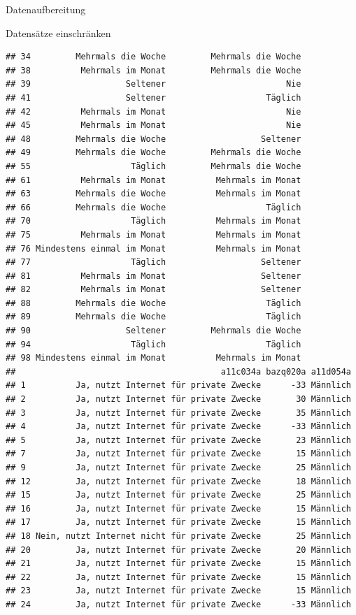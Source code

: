 \documentclass[ignorenonframetext,]{beamer}
\begin{document}
\begin{frame}[fragile]{Datenaufbereitung}
\begin{block}{Datensätze einschränken}
\begin{verbatim}
## 34         Mehrmals die Woche         Mehrmals die Woche
## 38          Mehrmals im Monat         Mehrmals die Woche
## 39                   Seltener                        Nie
## 41                   Seltener                    Täglich
## 42          Mehrmals im Monat                        Nie
## 45          Mehrmals im Monat                        Nie
## 48         Mehrmals die Woche                   Seltener
## 49         Mehrmals die Woche         Mehrmals die Woche
## 55                    Täglich         Mehrmals die Woche
## 61          Mehrmals im Monat          Mehrmals im Monat
## 63         Mehrmals die Woche          Mehrmals im Monat
## 66         Mehrmals die Woche                    Täglich
## 70                    Täglich          Mehrmals im Monat
## 75          Mehrmals im Monat          Mehrmals im Monat
## 76 Mindestens einmal im Monat          Mehrmals im Monat
## 77                    Täglich                   Seltener
## 81          Mehrmals im Monat                   Seltener
## 82          Mehrmals im Monat                   Seltener
## 88         Mehrmals die Woche                    Täglich
## 89         Mehrmals die Woche                    Täglich
## 90                   Seltener         Mehrmals die Woche
## 94                    Täglich                    Täglich
## 98 Mindestens einmal im Monat          Mehrmals im Monat
##                                         a11c034a bazq020a a11d054a
## 1          Ja, nutzt Internet für private Zwecke      -33 Männlich
## 2          Ja, nutzt Internet für private Zwecke       30 Männlich
## 3          Ja, nutzt Internet für private Zwecke       35 Männlich
## 4          Ja, nutzt Internet für private Zwecke      -33 Männlich
## 5          Ja, nutzt Internet für private Zwecke       23 Männlich
## 7          Ja, nutzt Internet für private Zwecke       15 Männlich
## 9          Ja, nutzt Internet für private Zwecke       25 Männlich
## 12         Ja, nutzt Internet für private Zwecke       18 Männlich
## 15         Ja, nutzt Internet für private Zwecke       25 Männlich
## 16         Ja, nutzt Internet für private Zwecke       15 Männlich
## 17         Ja, nutzt Internet für private Zwecke       15 Männlich
## 18 Nein, nutzt Internet nicht für private Zwecke       25 Männlich
## 20         Ja, nutzt Internet für private Zwecke       20 Männlich
## 21         Ja, nutzt Internet für private Zwecke       15 Männlich
## 22         Ja, nutzt Internet für private Zwecke       15 Männlich
## 23         Ja, nutzt Internet für private Zwecke       15 Männlich
## 24         Ja, nutzt Internet für private Zwecke      -33 Männlich

\end{verbatim}
\end{block}
\end{frame}
\end{document}
